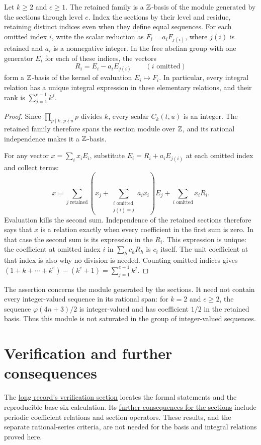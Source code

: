 \documentclass[11pt]{article}
\newcommand{\longrecord}[2]{\href{erdos249-totient-reasoning-surface.pdf\##1}{#2}}
\begin{document}
\begin{corollary}\label{cor:integral-normal-form}
Let $k\ge2$ and $e\ge1$. The retained family is a $\mathbb{Z}$-basis of the
module generated by the sections through level $e$. Index the sections
by their level and residue, retaining distinct indices even when they
define equal sequences. For each omitted index $i$, write the scalar
reduction as $F_i=a_iF_{j(i)}$, where $j(i)$ is retained and $a_i$ is a
nonnegative integer. In the free abelian group with one generator $E_i$
for each of these indices, the vectors
\[
 R_i=E_i-a_iE_{j(i)}\qquad(i\text{ omitted})
\]
form a $\mathbb{Z}$-basis of the kernel of evaluation $E_i\mapsto F_i$.
In particular, every integral relation has a unique integral expression
in these elementary relations, and their rank is
$\sum_{j=1}^{e-1}k^j$.
\end{corollary}
\begin{proof}
Since $\prod_{p\mid k,\,p\nmid u}p$ divides $k$, every scalar
$C_k(t,u)$ is an integer. The retained family therefore spans the
section module over $\mathbb{Z}$, and its rational independence makes it a
$\mathbb{Z}$-basis.

For any vector $x=\sum_i x_iE_i$, substitute
$E_i=R_i+a_iE_{j(i)}$ at each omitted index and collect terms:
\[
 x=\sum_{j\text{ retained}}
       \left(x_j+\sum_{\substack{i\text{ omitted}\\j(i)=j}}a_i x_i\right)E_j
       +\sum_{i\text{ omitted}}x_iR_i.
\]
Evaluation kills the second sum. Independence of the retained sections
therefore says that $x$ is a relation exactly when every coefficient
in the first sum is zero. In that case the second sum is its expression
in the $R_i$. This expression is unique: the coefficient at omitted
index $i$ in $\sum_h c_hR_h$ is $c_i$ itself. The unit coefficient
at that index is also why no division is needed.
Counting omitted indices gives
$(1+k+\cdots+k^e)-(k^e+1)=\sum_{j=1}^{e-1}k^j$.
\end{proof}
The assertion concerns the module generated by the sections.
It need not contain every integer-valued sequence in its rational
span: for $k=2$ and $e\ge2$, the sequence $\varphi(4n+3)/2$ is
integer-valued and has coefficient $1/2$ in the retained basis.
Thus this module is not saturated in the group of integer-valued
sequences.


\section*{Verification and further consequences}
\evidenceparagraph{\evidencerecordurl}
The \longrecord{scope-verification}{long record's verification section}
locates the formal statements and the reproducible base-six calculation.
Its \longrecord{short249-sources}{further consequences for the sections}
include periodic coefficient relations and section operators. These results,
and the separate rational-series criteria, are not needed for the basis
and integral relations proved here.
\end{document}
